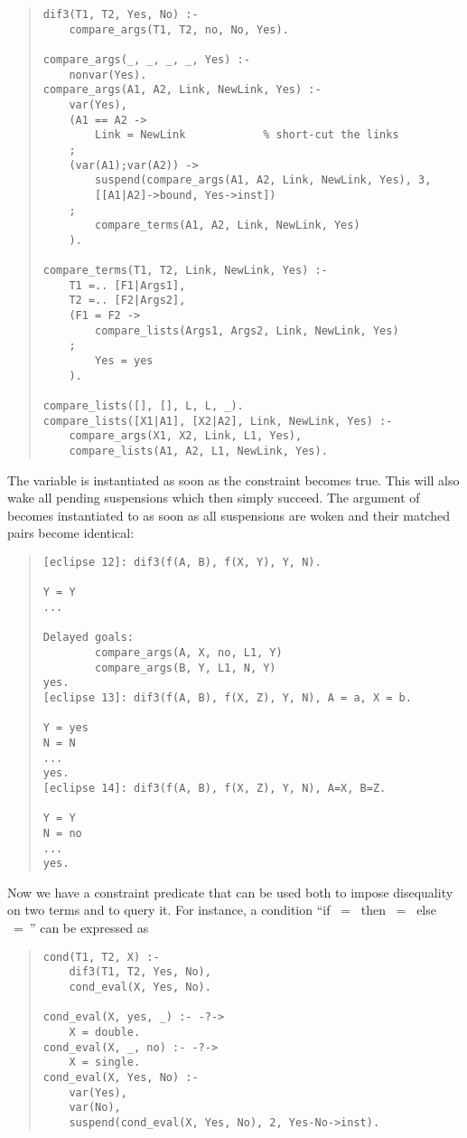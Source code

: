 \begin{quote}
\begin{verbatim}
dif3(T1, T2, Yes, No) :-
    compare_args(T1, T2, no, No, Yes).

compare_args(_, _, _, _, Yes) :-
    nonvar(Yes).
compare_args(A1, A2, Link, NewLink, Yes) :-
    var(Yes),
    (A1 == A2 ->
        Link = NewLink            % short-cut the links
    ;
    (var(A1);var(A2)) ->
        suspend(compare_args(A1, A2, Link, NewLink, Yes), 3,
	    [[A1|A2]->bound, Yes->inst])
    ;
        compare_terms(A1, A2, Link, NewLink, Yes)
    ).

compare_terms(T1, T2, Link, NewLink, Yes) :-
    T1 =.. [F1|Args1],
    T2 =.. [F2|Args2],
    (F1 = F2 ->
        compare_lists(Args1, Args2, Link, NewLink, Yes)
    ;
        Yes = yes
    ).

compare_lists([], [], L, L, _).
compare_lists([X1|A1], [X2|A2], Link, NewLink, Yes) :-
    compare_args(X1, X2, Link, L1, Yes),
    compare_lists(A1, A2, L1, NewLink, Yes).
\end{verbatim}
\end{quote}

The variable  is instantiated as soon as the constraint
becomes true.
This will also wake all pending suspensions which then simply succeed.
The argument  of  becomes instantiated to
as soon as all suspensions are woken and their matched pairs
become identical:

\begin{quote}
\begin{verbatim}
[eclipse 12]: dif3(f(A, B), f(X, Y), Y, N).

Y = Y
...

Delayed goals:
        compare_args(A, X, no, L1, Y)
        compare_args(B, Y, L1, N, Y)
yes.
[eclipse 13]: dif3(f(A, B), f(X, Z), Y, N), A = a, X = b.

Y = yes
N = N
...
yes.
[eclipse 14]: dif3(f(A, B), f(X, Z), Y, N), A=X, B=Z.

Y = Y
N = no
...
yes.
\end{verbatim}
\end{quote}

Now we have a constraint predicate that can be used both to impose
disequality on two terms and to query it.
For instance, a condition ``if ~=~ then
~=~ else ~=~''
can be expressed as
\begin{quote}
\begin{verbatim}
cond(T1, T2, X) :-
    dif3(T1, T2, Yes, No),
    cond_eval(X, Yes, No).

cond_eval(X, yes, _) :- -?->
    X = double.
cond_eval(X, _, no) :- -?->
    X = single.
cond_eval(X, Yes, No) :-
    var(Yes),
    var(No),
    suspend(cond_eval(X, Yes, No), 2, Yes-No->inst).
\end{verbatim}
\end{quote}

